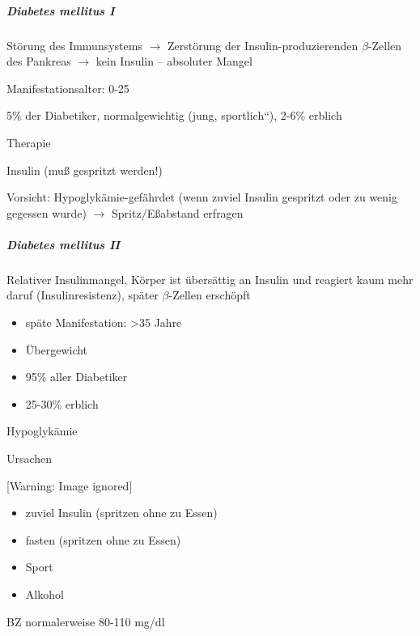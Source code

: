 \documentclass{article}
\begin{document}
\subparagraph[Diabetes \ mellitus I]{Diabetes  mellitus I}
St\"orung des Immunsystems ${\rightarrow}$ Zerst\"orung der
Insulin-produzierenden ${\beta}$-Zellen des Pankreas ${\rightarrow}$
kein Insulin -- absoluter Mangel

Manifestationsalter: 0-25

5\% der Diabetiker, normalgewichtig ({\quotedblbase}jung,
sportlich{\textquotedblleft}), 2-6\% erblich

Therapie

Insulin (mu{\ss} gespritzt werden!)

Vorsicht: Hypoglyk\"amie-gef\"ahrdet (wenn zuviel Insulin gespritzt oder
zu wenig gegessen wurde) ${\rightarrow}$  Spritz/E{\ss}abstand
er\-fra\-gen

\subparagraph[Diabetes \ mellitus II]{Diabetes  mellitus II}
Relativer Insulinmangel, K\"orper ist \"ubers\"attig an Insulin und
reagiert kaum mehr daruf (Insulinresistenz), sp\"ater ${\beta}$-Zellen
ersch\"opft

\begin{itemize}
\item sp\"ate Manifestation: {\textgreater}35 Jahre

\item \"Ubergewicht

\item 95\% aller Diabetiker

\item 25-30\% erblich

\end{itemize}
Hypoglyk\"amie

Ursachen

\begin{center}
 [Warning: Image ignored] %

\end{center}
\begin{itemize}
\item zuviel Insulin (spritzen ohne zu Essen)

\item fasten (spritzen ohne zu Essen)

\item Sport

\item Alkohol

\end{itemize}
BZ normalerweise 80-110 mg/dl
\end{document}
